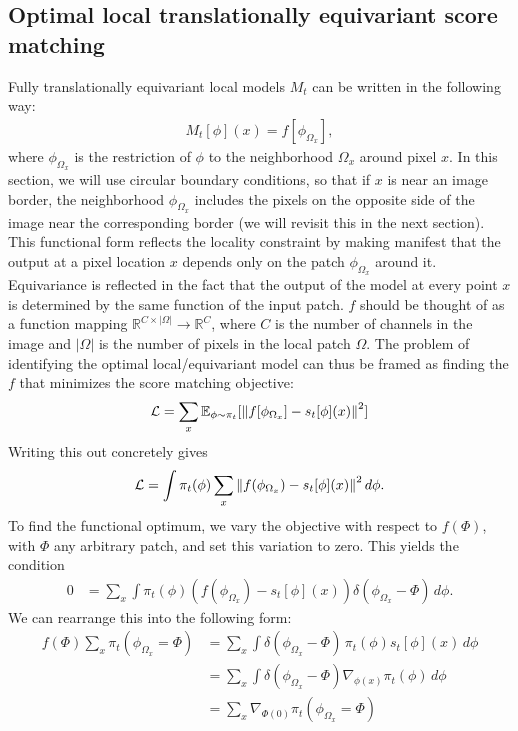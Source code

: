 \documentclass{article}
\theoremstyle{plain}
\theoremstyle{definition}
\theoremstyle{remark}
\begin{document}
\subsection{Optimal local translationally equivariant score matching}
Fully translationally equivariant local models $M_t$ can be written in the following way:
\begin{align}\label{eq:translational_kernel}
    M_t[\phi](x) = f[\phi_{\Omega_x}],
\end{align}
where $\phi_{\Omega_x}$ is the restriction of $\phi$ to the neighborhood $\Omega_x$ around pixel $x$. In this section, we will use circular boundary conditions, so that if $x$ is near an image border, the neighborhood $\phi_{\Omega_x}$ includes the pixels on the opposite side of the image near the corresponding border (we will revisit this in the next section). This functional form reflects the locality constraint by making manifest that the output at a pixel location $x$ depends only on the patch $\phi_{\Omega_x}$ around it. Equivariance is reflected in the fact that the output of the model at every point $x$ is determined by the same function of the input patch. $f$ should be thought of as a function mapping $\mathbb{R}^{C \times |\Omega|} \to \mathbb{R}^C$, where $C$ is the number of channels in the image and $|\Omega|$ is the number of pixels in the local patch $\Omega$. The problem of identifying the optimal local/equivariant model can thus be framed as finding the $f$ that minimizes the score matching objective:
\begin{align}
    \mathcal{L} = \sum_x \mathbb{E}_{\phi \sim \pi_t}[\norm{f[\phi_{\Omega_x}] - s_t[\phi](x)}^2]
\end{align}
Writing this out concretely gives 
\begin{align}
    \mathcal{L} = \int \pi_t(\phi) \sum_{x} \norm{f(\phi_{\Omega_x}) - s_t[\phi](x)}^2 \,d\phi.
\end{align}
To find the functional optimum, we vary the objective with respect to $f(\Phi)$, with $\Phi$ any arbitrary patch, and set this variation to zero. This yields the condition
\begin{align}
    0 &= \sum_x \int \pi_t(\phi) (f(\phi_{\Omega_x}) - s_t[\phi](x)) \delta(\phi_{\Omega_x} - \Phi)\,d\phi.
\end{align}
We can rearrange this into the following form:
\begin{align*}
    f(\Phi) \sum_x \pi_t(\phi_{\Omega_x} = \Phi) &= \sum_x \int \delta(\phi_{\Omega_x} - \Phi)\,\pi_t(\phi) s_t[\phi](x) \,d\phi\\
    &= \sum_x \int  \delta(\phi_{\Omega_x} - \Phi) \nabla_{\phi(x)} \pi_t(\phi)\,d\phi\\
    &= \sum_x \nabla_{\Phi(0)} \pi_t(\phi_{\Omega_x} = \Phi)
\end{align*}
\end{document}
